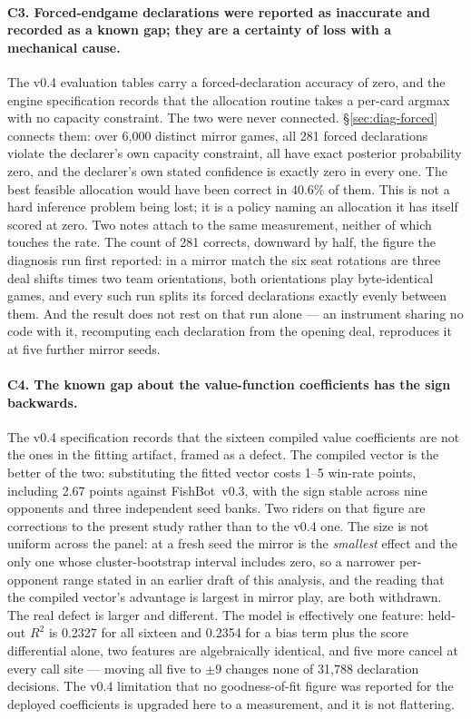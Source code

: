 \documentclass[11pt]{article}
\theoremstyle{definition}
\DeclareRobustCommand{\vthree}{\texorpdfstring{\mbox{FishBot v0.3}}{FishBot v0.3}}
\providecommand{\numForcedGames}{6{,}000}
\providecommand{\numForcedN}{281}
\providecommand{\numFeasibleRight}{40.6}
\providecommand{\numEfourteenCost}{2.67}
\providecommand{\numEfourteenRange}{1--5}
\providecommand{\numValueRSq}{0.2327}
\providecommand{\numValueRSqScore}{0.2354}
\providecommand{\numDeadFeatureDecisions}{31{,}788}
\providecommand{\numDeadFeatureSwing}{9}
\begin{document}
\paragraph{C3. Forced-endgame declarations were reported as inaccurate and
recorded as a known gap; they are a certainty of loss with a mechanical cause.}
The v0.4 evaluation tables carry a forced-declaration accuracy of zero, and the
engine specification records that the allocation routine takes a per-card argmax
with no capacity constraint. The two were never connected. \S\ref{sec:diag-forced}
connects them: over \numForcedGames{} distinct mirror games, all \numForcedN{}
forced declarations violate the declarer's own capacity constraint, all have
exact posterior probability zero, and the declarer's own stated confidence is
exactly zero in every one. The best feasible allocation would have been correct
in \numFeasibleRight\% of them. This is not a hard inference problem being lost;
it is a policy naming an allocation it has itself scored at zero. Two notes
attach to the same measurement, neither of which touches the rate. The count of
\numForcedN{} corrects, downward by half, the figure the diagnosis run first
reported: in a mirror match the six seat rotations are three deal shifts times
two team orientations, both orientations play byte-identical games, and every
such run splits its forced declarations exactly evenly between them. And the
result does not rest on that run alone --- an instrument sharing no code with it,
recomputing each declaration from the opening deal, reproduces it at five further
mirror seeds.

\paragraph{C4. The known gap about the value-function coefficients has the sign
backwards.} The v0.4 specification records that the sixteen compiled value
coefficients are not the ones in the fitting artifact, framed as a defect. The
compiled vector is the better of the two: substituting the fitted vector costs
\numEfourteenRange{} win-rate points, including \numEfourteenCost{} points
against \vthree{}, with the sign stable across nine opponents and three
independent seed banks. Two riders on that figure are corrections to the present
study rather than to the v0.4 one. The size is not uniform across the panel: at a
fresh seed the mirror is the \emph{smallest} effect and the only one whose
cluster-bootstrap interval includes zero, so a narrower per-opponent range stated
in an earlier draft of this analysis, and the reading that the compiled vector's
advantage is largest in mirror play, are both withdrawn. The real defect is
larger and different. The model is
effectively one feature: held-out $R^2$ is \numValueRSq{} for all sixteen and
\numValueRSqScore{} for a bias term plus the score differential alone, two
features are algebraically identical, and five more cancel at every call site ---
moving all five to $\pm\numDeadFeatureSwing$ changes none of \numDeadFeatureDecisions{} declaration
decisions. The v0.4 limitation that no goodness-of-fit figure was reported for
the deployed coefficients is upgraded here to a measurement, and it is not
flattering.
\end{document}
